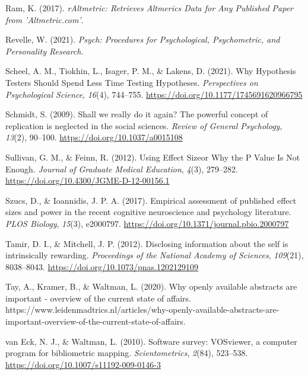 \documentclass[
  man,floatsintext]{apa6}
\newlength{\cslhangindent}
\newlength{\cslentryspacingunit} %
\newenvironment{CSLReferences}[2] %
 {%
  \setlength{\parindent}{0pt}
  \ifodd #1
  \let\oldpar\par
  \def\par{\hangindent=\cslhangindent\oldpar}
  \fi
  \setlength{\parskip}{#2\cslentryspacingunit}
 }%
 {}
\begin{document}
\begin{CSLReferences}{1}{0}
\leavevmode{}%
Ram, K. (2017). \emph{{rAltmetric}: {Retrieves Altmerics Data} for {Any Published Paper} from '{Altmetric}.com'}.

\leavevmode{}%
Revelle, W. (2021). \emph{Psych: {Procedures} for {Psychological}, {Psychometric}, and {Personality Research}}.

\leavevmode{}%
Scheel, A. M., Tiokhin, L., Isager, P. M., \& Lakens, D. (2021). Why {Hypothesis Testers Should Spend Less Time Testing Hypotheses}. \emph{Perspectives on Psychological Science}, \emph{16}(4), 744--755. \url{https://doi.org/10.1177/1745691620966795}

\leavevmode{}%
Schmidt, S. (2009). Shall we really do it again? {The} powerful concept of replication is neglected in the social sciences. \emph{Review of General Psychology}, \emph{13}(2), 90--100. \url{https://doi.org/10.1037/a0015108}

\leavevmode{}%
Sullivan, G. M., \& Feinn, R. (2012). Using {Effect Size}\textemdash or {Why} the {P Value Is Not Enough}. \emph{Journal of Graduate Medical Education}, \emph{4}(3), 279--282. \url{https://doi.org/10.4300/JGME-D-12-00156.1}

\leavevmode{}%
Szucs, D., \& Ioannidis, J. P. A. (2017). Empirical assessment of published effect sizes and power in the recent cognitive neuroscience and psychology literature. \emph{PLOS Biology}, \emph{15}(3), e2000797. \url{https://doi.org/10.1371/journal.pbio.2000797}

\leavevmode{}%
Tamir, D. I., \& Mitchell, J. P. (2012). Disclosing information about the self is intrinsically rewarding. \emph{Proceedings of the National Academy of Sciences}, \emph{109}(21), 8038--8043. \url{https://doi.org/10.1073/pnas.1202129109}

\leavevmode{}%
Tay, A., Kramer, B., \& Waltman, L. (2020). Why openly available abstracts are important - overview of the current state of affairs. https://www.leidenmadtrics.nl/articles/why-openly-available-abstracts-are-important-overview-of-the-current-state-of-affairs.

\leavevmode{}%
van Eck, N. J., \& Waltman, L. (2010). Software survey: {VOSviewer}, a computer program for bibliometric mapping. \emph{Scientometrics}, \emph{2}(84), 523--538. \url{https://doi.org/10.1007/s11192-009-0146-3}


\end{CSLReferences}
\end{document}
